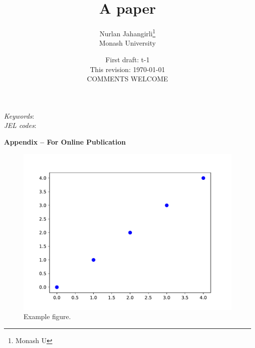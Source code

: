 \documentclass[12pt,twoside]{article}
\title{A paper}
\author{Nurlan Jahangirli\thanks{Monash U \njahangirliEmail} \\ Monash University}
\date{\color{ChadGreen} \large First draft: t-1 \\ This revision: \today \\ COMMENTS WELCOME}
\begin{document}
\maketitle



\begin{abstract}
\end{abstract}
\vspace{1cm}
{\small
	\noindent \textit{Keywords}:  \\
	\textit{JEL codes}: 
}
\thispagestyle{empty}
\newpage
\setcounter{page}{1}




%
%
%
%

	



\newpage
\clearpage

\begin{center} \Large \textbf{Appendix -- For Online Publication} \end{center}
\appendix
{}

%
%
%



\begin{figure}
	\includegraphics[width=\textwidth]{figures/chart.pdf}
\caption{Example figure. \label{fig:example}}
\end{figure}	
\end{document}
